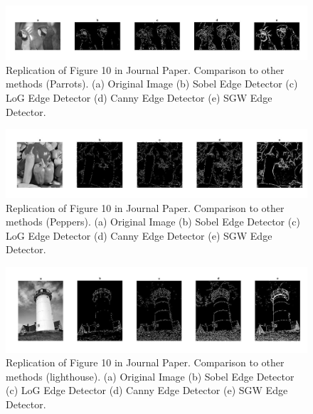 \documentclass[./rarnold_final_project.tex]{subfiles}
\begin{document}
	\begin{figure}[!htbp]
	\centering
	\includegraphics[scale=0.35]{"parrots"}
	\captionsetup{justification=centering}
	\caption{Replication of Figure 10 in Journal Paper. Comparison to other methods (Parrots). (a) Original Image (b) Sobel Edge Detector (c) LoG Edge Detector (d) Canny Edge Detector (e) SGW Edge Detector. \cite{main}} 
	\label{parrots}
	\end{figure}
	
	\begin{figure}[!htbp]
	\centering
	\includegraphics[scale=0.35]{"peppers"}
	\captionsetup{justification=centering}
	\caption{Replication of Figure 10 in Journal Paper. Comparison to other methods (Peppers). (a) Original Image (b) Sobel Edge Detector (c) LoG Edge Detector (d) Canny Edge Detector (e) SGW Edge Detector. \cite{main}} 
	\label{peppers}
	\end{figure}
	
	\clearpage
	
	\begin{figure}[!htbp]
	\centering
	\includegraphics[scale=0.35]{"lighthouse"}
	\captionsetup{justification=centering}
	\caption{Replication of Figure 10 in Journal Paper. Comparison to other methods (lighthouse). (a) Original Image (b) Sobel Edge Detector (c) LoG Edge Detector (d) Canny Edge Detector (e) SGW Edge Detector. \cite{main}} 
	\label{lighthouse}
	\end{figure}
\end{document}
